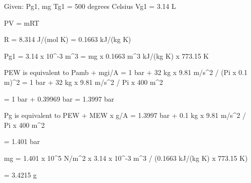 Given: Pg1, mg  
Tg1 = 500 degrees Celsius  
Vg1 = 3.14 L  

PV = mRT  

R = 8.314 J/(mol K) = 0.1663 kJ/(kg K)  

Pg1 = 3.14 x 10^-3 m^3 = mg x 0.1663 m^3 kJ/(kg K) x 773.15 K  

PEW is equivalent to Pamb + mgi/A  
= 1 bar + 32 kg x 9.81 m/s^2 / (Pi x 0.1 m)^2  
= 1 bar + 32 kg x 9.81 m/s^2 / Pi x 400 m^2  

= 1 bar + 0.39969 bar = 1.3997 bar  

Pg is equivalent to PEW + MEW x g/A  
= 1.3997 bar + 0.1 kg x 9.81 m/s^2 / Pi x 400 m^2  

= 1.401 bar  

mg = 1.401 x 10^5 N/m^2 x 3.14 x 10^-3 m^3 / (0.1663 kJ/(kg K) x 773.15 K)  

= 3.4215 g
